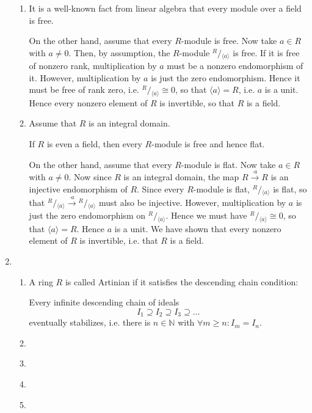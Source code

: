 \documentclass{article}
\newcommand\quotient[2]{{^{\displaystyle #1}}/{_{\displaystyle #2}}}
\begin{document}
\begin{enumerate}[style=nextline,label={Problem (\arabic*)}]
{\begin{enumerate}[label={(\alph*)}]
{\[\begin{array}{>{\displaystyle}c>{\displaystyle}l}
\cong & \mathbb{Q} \oplus 0 \\
\cong & \mathbb{Q} \\
\end{array}
\]
}
\item {
It is a well-known fact from linear algebra that every module over a field is free.
\par
On the other hand, assume that every $R$-module is free. Now take $a \in R$ with $a \neq 0$. Then, by assumption, the $R$-module $\quotient{R}{\langle a \rangle}$ is free. If it is free of nonzero rank, multiplication by $a$ must be a nonzero endomorphism of it. However, multiplication by $a$ is just the zero endomorphism. Hence it must be free of rank zero, i.e. $\quotient{R}{\langle a \rangle} \cong 0$, so that $\langle a \rangle = R$, i.e. $a$ is a unit. Hence every nonzero element of $R$ is invertible, so that $R$ is a field.
}
\item {
Assume that $R$ is an integral domain.
\par
If $R$ is even a field, then every $R$-module is free and hence flat.
\par
On the other hand, assume that every $R$-module is flat. Now take $a \in R$ with $a \neq 0$. Now since $R$ is an integral domain, the map $R \overset{\cdot a}{\to} R$ is an injective endomorphism of $R$. Since every $R$-module is flat, $\quotient{R}{\langle a \rangle}$ is flat, so that $\quotient{R}{\langle a \rangle} \overset{\cdot a}{\to} \quotient{R}{\langle a \rangle}$ must also be injective. However, multiplication by $a$ is just the zero endomorphism on $\quotient{R}{\langle a \rangle}$. Hence we must have $\quotient{R}{\langle a \rangle} \cong 0$, so that $\langle a \rangle = R$. Hence $a$ is a unit. We have shown that every nonzero element of $R$ is invertible, i.e. that $R$ is a field.
}
\end{enumerate}
}
\item {
\begin{enumerate}[label={(\alph*)}]
\item {
A ring $R$ is called Artinian if it satisfies the descending chain condition:
\par
Every infinite descending chain of ideals
\[
I_1 \supseteq I_2 \supseteq I_3 \supseteq \ldots
\]
eventually stabilizes, i.e. there is $n \in \mathbb{N}$ with $\forall m \geq n : I_m = I_n$.
}
\item {
}
\item {
}
\item {
}
\item {
}
\end{enumerate}
}
\end{enumerate}
\end{document}
